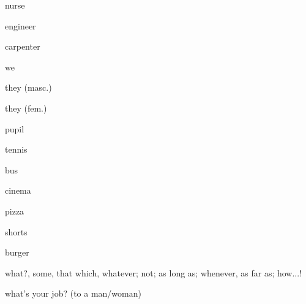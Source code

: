 \begin{flashcard}{\LARGE nurse}
\LARGE {}
\end{flashcard}
\begin{flashcard}{\LARGE engineer}
\LARGE {}
\end{flashcard}
\begin{flashcard}{\LARGE carpenter}
\LARGE {}
\end{flashcard}
\begin{flashcard}{\LARGE we}
\LARGE {}
\end{flashcard}
\begin{flashcard}{\LARGE they (masc.)}
\LARGE {}
\end{flashcard}
\begin{flashcard}{\LARGE they (fem.)}
\LARGE {}
\end{flashcard}
\begin{flashcard}{\LARGE pupil}
\LARGE {}
\end{flashcard}
\begin{flashcard}{\LARGE tennis}
\LARGE {}
\end{flashcard}
\begin{flashcard}{\LARGE bus}
\LARGE {}
\end{flashcard}
\begin{flashcard}{\LARGE cinema}
\LARGE {}
\end{flashcard}
\begin{flashcard}{\LARGE pizza}
\LARGE {}
\end{flashcard}
\begin{flashcard}{\LARGE shorts}
\LARGE {}
\end{flashcard}
\begin{flashcard}{\LARGE burger}
\LARGE {}
\end{flashcard}
\begin{flashcard}{\LARGE what?, some, that which, whatever; not; as long as; whenever, as far as; how...!}
\LARGE {}
\end{flashcard}
\begin{flashcard}{\LARGE what's your job? (to a man/woman)}
\LARGE {}
\end{flashcard}
